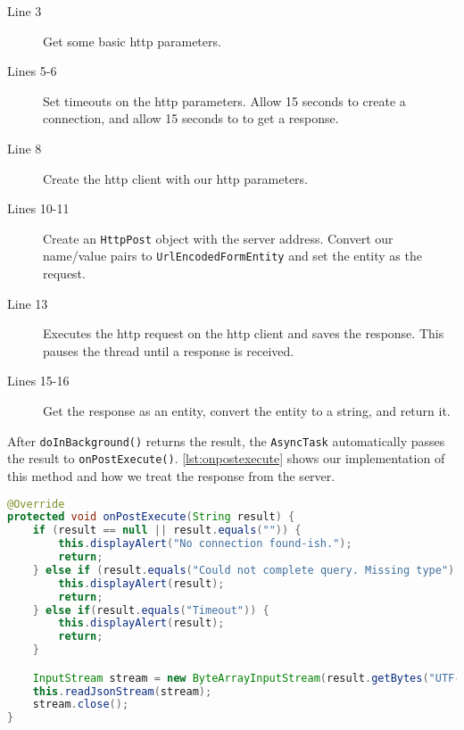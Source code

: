 \begin{description}
\item[Line 3] Get some basic \ac {http} parameters.
\item[Lines 5-6] Set timeouts on the \ac {http} parameters. Allow 15 seconds to create a connection, and allow 15 seconds to to get a response.
\item[Line 8] Create the \ac {http} client with our \ac {http} parameters.
\item[Lines 10-11] Create an \lstinline|HttpPost| object with the server address. Convert our name/value pairs to \lstinline|UrlEncodedFormEntity| and set the entity as the request.
\item[Line 13] Executes the \ac {http} request on the \ac {http} client and saves the response. This pauses the thread until a response is received.
\item[Lines 15-16] Get the response as an entity, convert the entity to a string, and return it.
\end{description}
After \lstinline|doInBackground()| returns the result, the \lstinline|AsyncTask| automatically passes the result to \lstinline|onPostExecute()|. \autoref{lst:onpostexecute} shows our implementation of this method and how we treat the response from the server.

\begin{lstlisting}[language=java, label=lst:onpostexecute, caption={The async method \lstinline|onPostExecute()|}]
@Override
protected void onPostExecute(String result) {
    if (result == null || result.equals("")) {
        this.displayAlert("No connection found-ish.");
        return;
    } else if (result.equals("Could not complete query. Missing type") || result.equals("Missing request code!")) {
        this.displayAlert(result);
        return;
    } else if(result.equals("Timeout")) {
        this.displayAlert(result);
        return;
    }

    InputStream stream = new ByteArrayInputStream(result.getBytes("UTF-8"));
    this.readJsonStream(stream);
    stream.close();
}
\end{lstlisting}

